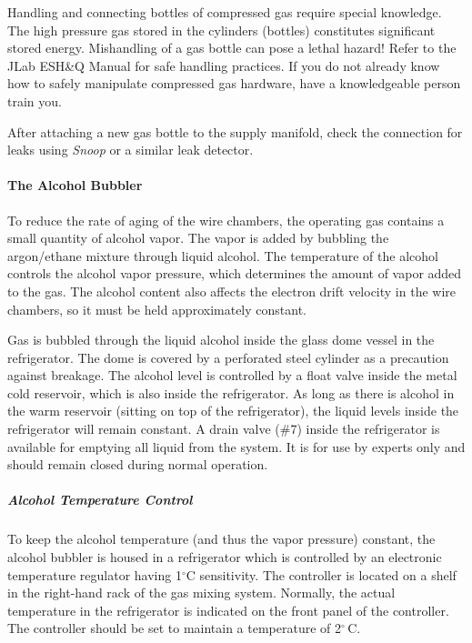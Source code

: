 {Handling and connecting bottles of compressed gas require special
knowledge.  The high pressure gas stored in the cylinders (bottles)
constitutes significant stored energy. Mishandling of a gas bottle can
pose a lethal hazard! Refer to the JLab ESH\&Q Manual
for safe handling practices. If you do not already know how to safely
manipulate compressed gas hardware, have a knowledgeable person train
you.

After attaching a new gas bottle to the supply manifold, check the
connection for leaks using \emph{Snoop} or a similar leak detector.

\paragraph{The Alcohol Bubbler}

To reduce the rate of aging of the wire chambers, the operating gas
contains a small quantity of alcohol vapor. The vapor is added by
bubbling the argon/ethane mixture through liquid alcohol. The
temperature of the alcohol controls the alcohol vapor pressure, which
determines the amount of vapor added to the gas. The alcohol content
also affects the electron drift velocity in the wire chambers, so it
must be held approximately constant.

Gas is bubbled through the liquid alcohol inside the glass
dome vessel in the refrigerator. The dome is covered by a
perforated steel cylinder as a precaution against breakage. The
alcohol level is controlled by a float valve inside the metal cold
reservoir, which is also inside the refrigerator. As long as there is
alcohol in the warm reservoir (sitting on top of the refrigerator),
the liquid levels inside the refrigerator will remain constant. A
drain valve (\#7) inside the refrigerator is available for emptying
all liquid from the system.  It is for use by experts only and should
remain closed during normal operation.

\subparagraph {Alcohol Temperature Control}

To keep the alcohol temperature (and thus the vapor pressure) constant,
the alcohol bubbler is housed in a refrigerator which is controlled by
an electronic temperature regulator having 1$^\circ$C sensitivity. The
controller is located on a shelf in the right-hand rack of the gas mixing
system. Normally, the actual temperature in the refrigerator is
indicated on the front panel of the controller. The controller should
be set to maintain a temperature of 2$^\circ$\,C.

}
